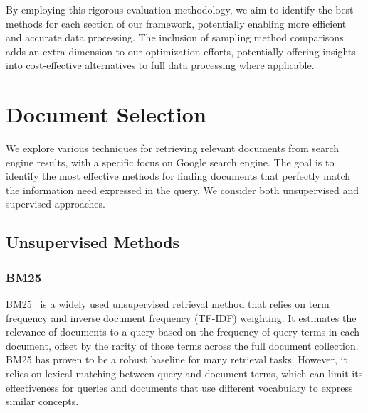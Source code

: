 By employing this rigorous evaluation methodology, we aim to identify the best methods for each section of our framework, potentially enabling more efficient and accurate data processing.
The inclusion of sampling method comparisons adds an extra dimension to our optimization efforts, potentially offering insights into cost-effective alternatives to full data processing where applicable.



\section{Document Selection}\label{sec:document-selection}
We explore various techniques for retrieving relevant documents from search engine results, with a specific focus on Google search engine.
The goal is to identify the most effective methods for finding documents that perfectly match the information need expressed in the query.
We consider both unsupervised and supervised approaches.

\subsection{Unsupervised Methods}\label{subsec:unsupervised-methods}

\subsubsection{BM25}
BM25~\cite{bm25} is a widely used unsupervised retrieval method that relies on term frequency and inverse document frequency (TF-IDF) weighting.
It estimates the relevance of documents to a query based on the frequency of query terms in each document, offset by the rarity of those terms across the full document collection.
BM25 has proven to be a robust baseline for many retrieval tasks.
However, it relies on lexical matching between query and document terms, which can limit its effectiveness for queries and documents that use different vocabulary to express similar concepts.

